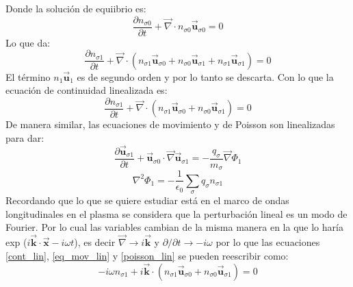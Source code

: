 \documentclass[../tesis_main_file.tex]{subfiles}
\begin{document}
Donde la solución de equiibrio es:
\begin{equation}
\frac{\partial n_{\sigma 0}}{\partial t} + \overrightarrow{\nabla} \cdot n_{\sigma 0}\overrightarrow{\textbf{u}}_{\sigma 0}=0
\end{equation}
Lo que da:
\begin{equation}
\frac{\partial n_{\sigma 1}}{\partial t}+ \overrightarrow{\nabla} \cdot (n_{\sigma 1} \overrightarrow{\textbf{u}}_{\sigma 0} + n_{\sigma 0} \overrightarrow{\textbf{u}}_{\sigma 1} + n_{\sigma 1} \overrightarrow{\textbf{u}}_{\sigma 1}) =0
\end{equation}
El término $n_1 \overrightarrow{\textbf{u}}_1$ es de segundo orden y por lo tanto se descarta. Con lo que la ecuación de continuidad linealizada es:
\begin{equation}
\label{cont_lin}
\frac{\partial n_{\sigma 1}}{\partial t}+ \overrightarrow{\nabla} \cdot (n_{\sigma 1} \overrightarrow{\textbf{u}}_{\sigma 0} + n_{\sigma 0} \overrightarrow{\textbf{u}}_{\sigma 1}) =0
\end{equation}
De manera similar, las ecuaciones de movimiento y de Poisson son linealizadas para dar:
\begin{equation}
\label{eq_mov_lin}
\frac{\partial \overrightarrow{\textbf{u}}_{\sigma 1}}{\partial t} + \overrightarrow{\textbf{u}}_{\sigma 0} \cdot \overrightarrow{\nabla}\overrightarrow{\textbf{u}}_{\sigma 1} = - \frac{q_{\sigma}}{m_{\sigma}} \overrightarrow{\nabla}\Phi _1
\end{equation}
\begin{equation}
\label{poisson_lin}
\nabla ^2 \Phi _1 = -\frac{1}{\epsilon_0}\sum _{\sigma}q_{\sigma} n_{\sigma 1}
\end{equation}
Recordando que lo que se quiere estudiar está en el marco de ondas longitudinales en el plasma se considera que la perturbación lineal es un modo de Fourier. Por lo cual las variables cambian de la misma manera en la que lo haría exp ($i \overrightarrow{\textbf{k}} \cdot \overrightarrow{\textbf{x}} - i \omega t $), es decir $\overrightarrow{\nabla} \rightarrow i\overrightarrow{\textbf{k}}$ y $\partial / \partial t \rightarrow -i \omega$ por lo que las ecuaciones \ref{cont_lin}, \ref{eq_mov_lin} y \ref{poisson_lin} se pueden reescribir como:
\begin{equation}
\label{cont_fourier}
 -i \omega n_{\sigma 1}+ i\overrightarrow{\textbf{k}} \cdot (n_{\sigma 1} \overrightarrow{\textbf{u}}_{\sigma 0} + n_{\sigma 0} \overrightarrow{\textbf{u}}_{\sigma 1}) =0
\end{equation}
\end{document}
